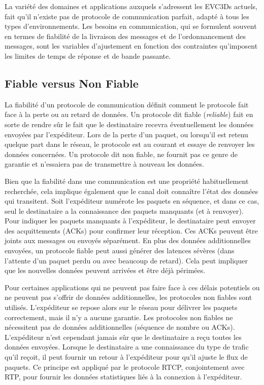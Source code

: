 La variété des domaines et applications auxquels s'adressent les 
\glspl{EVC3D} actuels, fait qu'il n'existe pas de protocole de 
communication parfait, adapté à tous les types d'environnements. 
Les besoins en communication, qui se formulent souvent en termes de 
fiabilité de la livraison des messages et de l'ordonnancement des messages, sont 
les variables d'ajustement en fonction des contraintes qu'imposent les limites de 
temps de réponse et de bande passante.

\subsection{Fiable versus Non Fiable}
\label{sec:fiabilite}
La fiabilité d'un protocole de communication définit comment le protocole fait face 
à la perte ou au retard de données. Un protocole dit \og fiable\fg{} (\textit{reliable}) 
fait en sorte de rendre sûr le fait que le destinataire recevra éventuellement les 
données envoyées par l'expéditeur. Lors de la perte d'un paquet, ou lorsqu'il est 
retenu quelque part dans le réseau, le protocole est au courant et essaye de 
renvoyer les données concernées. Un protocole dit \og non fiable\fg{}, ne fournit 
pas ce genre de garantie et n'essaiera pas de transmettre à nouveau les données.

Bien que la fiabilité dans une communication est une propriété habituellement 
recherchée, cela implique également que le canal doit connaître l'état des données 
qui transitent. Soit l'expéditeur numérote les paquets en séquence, et dans ce 
cas, seul le destinataire a la connaissance des paquets manquants (et à 
renvoyer). Pour indiquer les paquets manquants à l'expéditeur, le destinataire peut 
envoyer des acquittements (ACKs) pour confirmer leur réception. Ces ACKs 
peuvent être joints aux messages ou envoyés séparément. En plus des données 
additionnelles envoyées, un protocole fiable peut aussi générer des latences 
sévères (dans l'attente d'un paquet perdu ou avec beaucoup de retard). Cela peut 
impliquer que les \og nouvelles\fg{} données peuvent arrivées et être déjà 
périmées.

Pour certaines applications qui ne peuvent pas faire face à ces délais potentiels 
ou ne peuvent pas s'offrir de données additionnelles, les protocoles non fiables 
sont utilisés. 
L'expéditeur se repose alors sur le réseau pour délivrer les paquets 
correctement, mais il n'y a aucune garantie. Les protocoles non fiables ne 
nécessitent pas de données additionnelles (séquence de nombre ou ACKs). 
L'expéditeur n'est cependant jamais sûr que le destinataire a reçu toutes les 
données envoyées. Lorsque le destinataire a une connaissance du type de trafic qu'il reçoit, 
il peut fournir un retour à l'expéditeur pour qu'il ajuste le flux de paquets. Ce 
principe est appliqué par le protocole \gls{RTCP}, conjointement avec \gls{RTP}, 
pour fournir les données statistiques liés à la  connexion à l'expéditeur.

